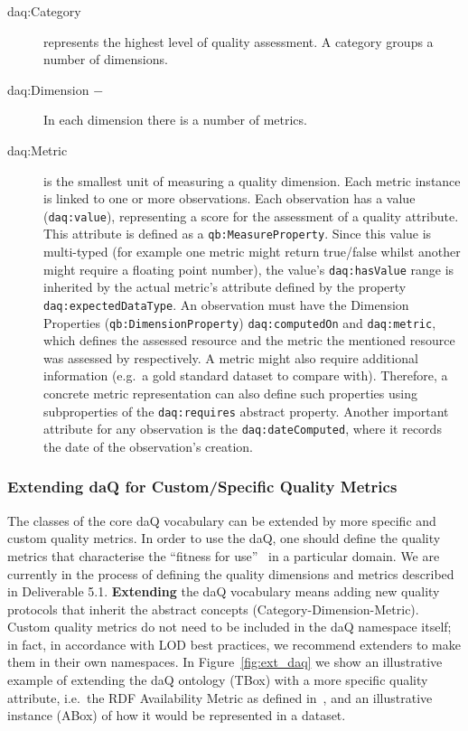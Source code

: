 \begin{description}
\item[daq:Category] represents the highest level of quality assessment.
  A category groups a number of dimensions.
\item[daq:Dimension $-$] In each dimension there is a number of metrics.
\item[daq:Metric] is the smallest unit of measuring a quality dimension.
  Each metric instance is linked to one or more observations. 
  Each observation has a value (\texttt{daq:value}), representing a score for the assessment of a quality attribute.
  This attribute is defined as a \texttt{qb:MeasureProperty}.
   Since this value is multi-typed (for example one metric might return true/false whilst another might require a floating point number), the value's \texttt{daq:hasValue} range is inherited by the actual metric's attribute defined by the property \texttt{daq:expectedDataType}.
  An observation must have the Dimension Properties (\texttt{qb:DimensionProperty}) \texttt{daq:computedOn} and \texttt{daq:metric}, which defines the assessed resource and the metric the mentioned resource was assessed by respectively.
  A metric might also require additional information (e.g.\ a gold standard dataset to compare with).
  Therefore, a concrete metric representation can also define such properties using subproperties of the \texttt{daq:requires} abstract property.
  Another important attribute for any observation is the \texttt{daq:dateComputed}, where it records the date of the observation's creation.
\end{description}

\subsubsection{Extending daQ for Custom/Specific Quality Metrics}
\label{sec:extendingDAQ}
The classes of the core daQ vocabulary can be extended by more specific and custom quality metrics. 
In order to use the daQ, one should define the quality metrics that characterise the ``fitness for use''~\cite{Juran1974:biblatex} in a particular domain.
We are currently in the process of defining the quality dimensions and metrics described in Deliverable 5.1.
\textbf{Extending} the daQ vocabulary means adding new quality protocols that inherit the abstract concepts (Category-Dimension-Metric).
Custom quality metrics do not need to be included in the daQ namespace itself; in fact, in accordance with LOD best practices, we recommend extenders to make them in their own namespaces.
In Figure~\ref{fig:ext_daq} we show an illustrative example of extending the daQ ontology (TBox) with a more specific quality attribute, i.e.\ the RDF Availability Metric as defined in~\cite{Zaveri2012:LODQ}, and an illustrative instance (ABox) of how it would be represented in a dataset.

